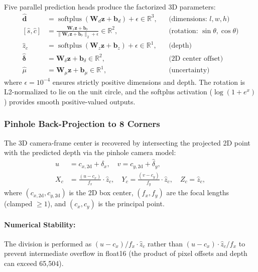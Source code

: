 \documentclass[runningheads]{llncs}
\newcommand{\mR}{\mathbb{R}}
\newcommand{\op}[1]{\operatorname{#1}}
\newcommand{\mat}[1]{\bm{#1}}
\begin{document}
Five parallel prediction heads produce the factorized 3D parameters:
\begin{align}
    \hat{\mat{d}} &= \op{softplus}(\mat{W}_d \mat{z} + \mat{b}_d) + \epsilon \in \mR^{3}, & &\text{(dimensions: $l, w, h$)} \label{eq:dims} \\
    [\hat{s}, \hat{c}] &= \frac{\mat{W}_r \mat{z} + \mat{b}_r}{\|\mat{W}_r \mat{z} + \mat{b}_r\|_2 + \epsilon} \in \mR^{2}, & &\text{(rotation: $\sin\theta, \cos\theta$)} \label{eq:rot} \\
    \hat{z}_c &= \op{softplus}(\mat{W}_z \mat{z} + \mat{b}_z) + \epsilon \in \mR^{1}, & &\text{(depth)} \label{eq:depth} \\
    \hat{\mat{\delta}} &= \mat{W}_\delta \mat{z} + \mat{b}_\delta \in \mR^{2}, & &\text{(2D center offset)} \label{eq:offset} \\
    \hat{\mu} &= \mat{W}_\mu \mat{z} + \mat{b}_\mu \in \mR^{1}, & &\text{(uncertainty)} \label{eq:mu}
\end{align}
where $\epsilon = 10^{-4}$ ensures strictly positive dimensions and depth.  The rotation is L2-normalized to lie on the unit circle, and the softplus activation ($\log(1 + e^x)$) provides smooth positive-valued outputs.

\subsubsection{Pinhole Back-Projection to 8 Corners}
\label{sec:backproj}

The 3D camera-frame center is recovered by intersecting the projected 2D point with the predicted depth via the pinhole camera model:
\begin{align}
    u &= c_{x,\text{2d}} + \hat{\delta}_x, \quad v = c_{y,\text{2d}} + \hat{\delta}_y, \label{eq:projected_center} \\
    X_c &= \frac{(u - c_x)}{f_x} \cdot \hat{z}_c, \quad Y_c = \frac{(v - c_y)}{f_y} \cdot \hat{z}_c, \quad Z_c = \hat{z}_c, \label{eq:cam_center}
\end{align}
where $(c_{x,\text{2d}}, c_{y,\text{2d}})$ is the 2D box center, $(f_x, f_y)$ are the focal lengths (clamped $\geq 1$), and $(c_x, c_y)$ is the principal point.

\paragraph{Numerical Stability:} The division is performed as $(u - c_x) / f_x \cdot \hat{z}_c$ rather than $(u - c_x) \cdot \hat{z}_c / f_x$ to prevent intermediate overflow in float16 (the product of pixel offsets and depth can exceed 65,504).
\end{document}
